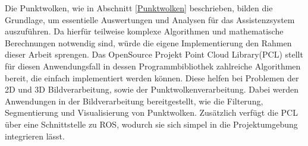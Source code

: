 Die Punktwolken, wie in Abschnitt \ref{Punktwolken} beschrieben, bilden die Grundlage, um essentielle Auswertungen und Analysen für das Assistenzsystem auszuführen. Da hierfür teilweise komplexe Algorithmen und mathematische Berechnungen notwendig sind, würde die eigene Implementierung den Rahmen dieser Arbeit sprengen. \newline
Das OpenSource Projekt Point Cloud Library(PCL) stellt für diesen Anwendungsfall in dessen Programmbibliothek zahlreiche Algorithmen bereit, die einfach implementiert werden können. Diese helfen bei Problemen der 2D und 3D Bildverarbeitung, sowie der Punktwolkenverarbeitung.\cite{pclGeneral} %
Dabei werden Anwendungen in der Bildverarbeitung bereitgestellt, wie die Filterung, Segmentierung und Visualisierung von Punktwolken. \newline
Zusätzlich verfügt die PCL über eine Schnittstelle zu ROS, wodurch sie sich simpel in die Projektumgebung integrieren lässt.